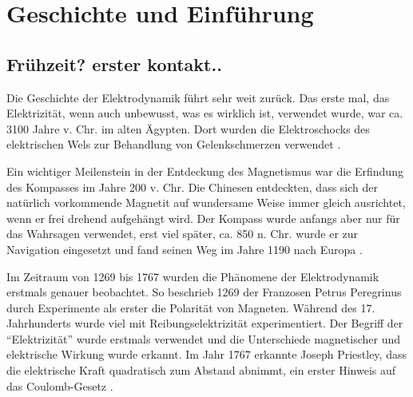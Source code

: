 %
%
%
\section{Geschichte und Einführung\label{maxwell:section:teil0}}

\subsection{Frühzeit? erster kontakt..}
Die Geschichte der Elektrodynamik führt sehr weit zurück.
Das erste mal, das Elektrizität, wenn auch unbewusst, was es wirklich ist, verwendet wurde, war ca. 3100 Jahre v. Chr. im alten Ägypten.
Dort wurden die Elektroschocks des elektrischen Wels zur Behandlung von Gelenkschmerzen verwendet \cite{maxwell:History_of_bioelectricity}.

Ein wichtiger Meilenstein in der Entdeckung des Magnetismus war die Erfindung des Kompasses im Jahre 200 v. Chr.
Die Chinesen entdeckten, dass sich der natürlich vorkommende Magnetit auf wundersame Weise immer gleich ausrichtet, wenn er frei drehend aufgehängt wird.
Der Kompass wurde anfangs aber nur für das Wahrsagen verwendet, erst viel später, ca. 850 n. Chr. wurde er zur Navigation eingesetzt und fand seinen Weg im Jahre 1190 nach Europa \cite{maxwell:History_of_the_compass}.

Im Zeitraum von 1269 bis 1767 wurden die Phänomene der Elektrodynamik erstmals genauer beobachtet.
So beschrieb 1269 der Franzosen Petrus Peregrinus durch Experimente als erster die Polarität von Magneten.
Während des 17. Jahrhunderts wurde viel mit Reibungselektrizität experimentiert. Der Begriff der ``Elektrizität'' wurde erstmals verwendet und die Unterschiede magnetischer und elektrische Wirkung wurde erkannt.
Im Jahr 1767 erkannte Joseph Priestley, dass die elektrische Kraft quadratisch zum Abstand abnimmt, ein erster Hinweis auf das Coulomb-Gesetz \cite{maxwell:History_of_electromagnetic_theory}.


